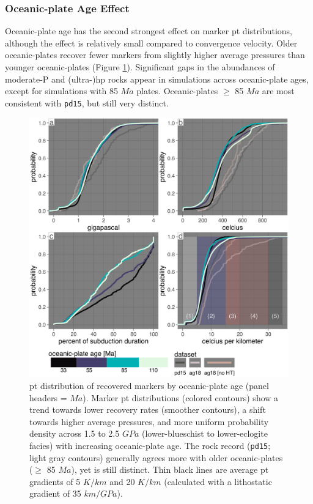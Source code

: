 \hypertarget{oceanic-plate-age-effect}{%
\subsubsection{Oceanic-plate Age Effect}\label{oceanic-plate-age-effect}}

Oceanic-plate age has the second strongest effect on marker \gls{pt} distributions, although the effect is relatively small compared to convergence velocity. Older oceanic-plates recover fewer markers from slightly higher average pressures than younger oceanic-plates (Figure \ref{fig:ageDensity}). Significant gaps in the abundances of moderate-P and (ultra-)\gls{hp} rocks appear in simulations across oceanic-plate ages, except for simulations with 85 \(Ma\) plates. Oceanic-plates \(\geq\) 85 \(Ma\) are most consistent with \texttt{pd15}, but still very distinct.



\begin{figure}[htbp]

{\centering \includegraphics[width=1\linewidth,]{assets/figs/chpt4/age_cdf} 

}

\caption[\gls{pt} distribution of recovered markers by oceanic-plate age]{\gls{pt} distribution of recovered markers by oceanic-plate age (panel headers = \(Ma\)). Marker \gls{pt} distributions (colored contours) show a trend towards lower recovery rates (smoother contours), a shift towards higher average pressures, and more uniform probability density across 1.5 to 2.5 \(GPa\) (lower-blueschist to lower-eclogite facies) with increasing oceanic-plate age. The rock record (\texttt{pd15}; light gray contours) generally agrees more with older oceanic-plates (\(\geq\) 85 \(Ma\)), yet is still distinct. Thin black lines are average \gls{pt} gradients of 5 \(K/km\) and 20 \(K/km\) (calculated with a lithostatic gradient of 35 \(km/GPa\)).}\label{fig:ageDensity}
\end{figure}

